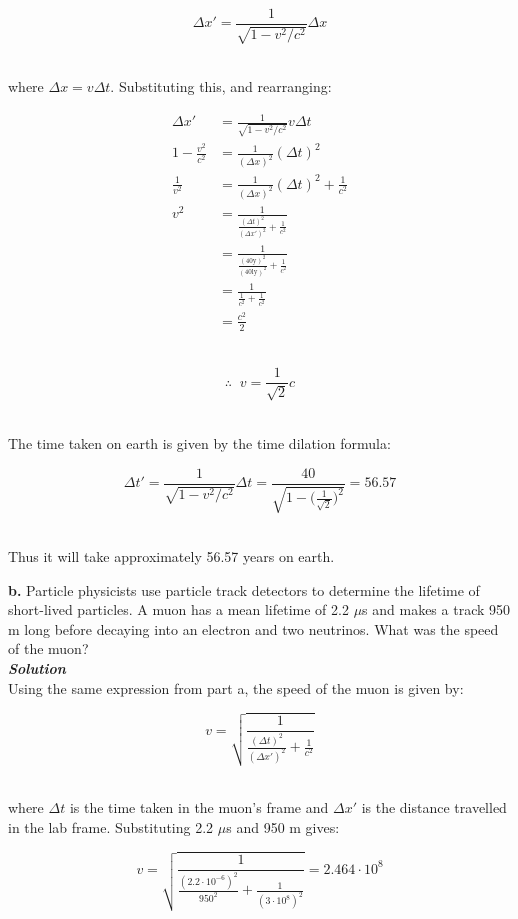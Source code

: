 \documentclass[9pt]{extarticle}
\newcommand{\bfit}[1]{\textbf{\textit{#1}}}
\begin{document}
\begin{multicols*}{2}
$$\Delta x' = \frac{1}{\sqrt{1-v^2/c^2}} \Delta x$$ \ 

where $\Delta x = v \Delta t$. Substituting this, and rearranging:

$$
\begin{aligned}
	\Delta x' &= \frac{1}{\sqrt{1-v^2/c^2}} v \Delta t \\ 
	1-\frac{v^2}{c^2} &= \frac{1}{(\Delta x)^2} (\Delta t)^2 \\ 
	\frac{1}{v^2} &= \frac{1}{(\Delta x)^2} (\Delta t)^2 + \frac{1}{c^2} \\ 
	v^2 &= \frac{1}{\frac{(\Delta t)^2}{(\Delta x')^2} + \frac{1}{c^2}} \\ 
	&= \frac{1}{\frac{(40\text{y})^2}{(40\text{ly})^2} + \frac{1}{c^2}} \\ 
	&= \frac{1}{\frac{1}{c^2} + \frac{1}{c^2}} \\ 
	&= \frac{c^2}{2}
\end{aligned}
$$ \ 

$$\therefore \;\; v = \frac{1}{\sqrt 2}c$$ \ 

The time taken on earth is given by the time dilation formula:

$$\Delta t' = \frac{1}{\sqrt{1-v^2/c^2}} \Delta t = \frac{40}{\sqrt{1 - \big( \tfrac{1}{\sqrt 2} \big)^2}} = 56.57$$ \ 

Thus it will take approximately 56.57 years on earth. \\ 






\dotfill 

\hfill 

{\Large \bf b.} Particle physicists use particle track detectors to determine the lifetime of short-lived particles. A muon has a mean lifetime of 2.2 $\mu$s and makes a track 950 m long before decaying into an electron and two neutrinos. What was the speed of the muon? \\ 

{\bfit{Solution}} \\ 

Using the same expression from part a, the speed of the muon is given by:

$$v = \sqrt{\frac{1}{\frac{(\Delta t)^2}{(\Delta x')^2} + \frac{1}{c^2}}}$$ \ 

where $\Delta t$ is the time taken in the muon's frame and $\Delta x'$ is the distance travelled in the lab frame. Substituting 2.2 $\mu$s and 950 m gives:

$$v = \sqrt{\frac{1}{\frac{(2.2\cdot 10^{-6})^2}{950^2} + \frac{1}{(3 \cdot 10^8)^2}}} = 2.464 \cdot 10^8$$ \ 


\end{multicols*}
\end{document}
